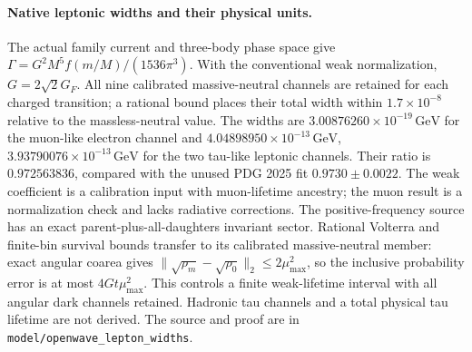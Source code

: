 \paragraph{Native leptonic widths and their physical units.}
The actual family current and three-body phase space give
\(\Gamma=G^2M^5f(m/M)/(1536\pi^3)\).
With the conventional weak normalization, \(G=2\sqrt2G_F\).
All nine calibrated massive-neutral channels are retained for each charged
transition; a rational bound places their total width within
\(1.7\times10^{-8}\) relative to the massless-neutral value.
The widths are \(3.00876260\times10^{-19}\,\mathrm{GeV}\) for the muon-like
electron channel and \(4.04898950\times10^{-13}\,\mathrm{GeV}\),
\(3.93790076\times10^{-13}\,\mathrm{GeV}\) for the two tau-like leptonic
channels. Their ratio is \(0.972563836\), compared with the unused PDG 2025
fit \(0.9730\pm0.0022\). The weak coefficient is a calibration input with
muon-lifetime ancestry; the muon result is a normalization check and lacks
radiative corrections. The positive-frequency source has an exact
parent-plus-all-daughters invariant sector. Rational Volterra and finite-bin survival bounds transfer to its calibrated
massive-neutral member: exact angular coarea gives
\(\|\sqrt{\rho_m}-\sqrt{\rho_0}\|_2\leq2\mu_{\max}^2\),
so the inclusive probability error is at most \(4Gt\mu_{\max}^2\).
This controls a finite weak-lifetime interval with all angular dark channels
retained.
Hadronic tau channels and a total physical tau lifetime are not derived.
The source and proof are in \texttt{model/openwave\_lepton\_widths}.

